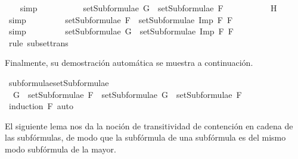 \begin{isabellebody}
\ {}\ \isamarkupfalse%
\ simp\ %
\isanewline
\ \ \ \ \ \ \isamarkupfalse%
\ \isamarkupfalse%
\ {}{}{\isacharcolon}{\isachardoublequoteopen}setSubformulae\ G\ {\isasymsubseteq}\ setSubformulae\ F{}{\isachardoublequoteclose}\ \isanewline
\ \ \ \ \ \ \ \ \isamarkupfalse%
\ H{}\ \isamarkupfalse%
\ simp\ %
\isanewline
\ \ \ \ \ \ \isamarkupfalse%
\ {}{}{\isacharcolon}{\isachardoublequoteopen}setSubformulae\ F{}\ {\isasymsubseteq}\ setSubformulae\ {\isacharparenleft}Imp\ F{}\ F{}{\isacharparenright}{\isachardoublequoteclose}\ \isanewline
\ \ \ \ \ \ \ \ \isamarkupfalse%
\ {}\ \isamarkupfalse%
\ simp\ %
\isanewline
\ \ \ \ \ \ \isamarkupfalse%
\ {\isachardoublequoteopen}setSubformulae\ G\ {\isasymsubseteq}\ setSubformulae\ {\isacharparenleft}Imp\ F{}\ F{}{\isacharparenright}{\isachardoublequoteclose}\ \isanewline
\ \ \ \ \ \ \ \ \isamarkupfalse%
\ {}{}\ {}{}\ \isamarkupfalse%
\ {\isacharparenleft}rule\ subset{\isacharunderscore}trans{\isacharparenright}\isanewline
\ \ \ \ \isamarkupfalse%
\isanewline
\ \ \isamarkupfalse%
\isanewline
{}\isamarkupfalse%
%
\endisatagproof
{\isafoldproof}%
%
\isadelimproof
%
\endisadelimproof
%
\begin{isamarkuptext}%
Finalmente, su demostración automática se muestra a continuación.%
\end{isamarkuptext}\isamarkuptrue%
\isamarkupfalse%
\ subformulae{\isacharunderscore}setSubformulae{\isacharcolon}\isanewline
\ \ {\isachardoublequoteopen}G\ {\isasymin}\ setSubformulae\ F\ {\isasymLongrightarrow}\ setSubformulae\ G\ {\isasymsubseteq}\ setSubformulae\ F{\isachardoublequoteclose}\isanewline
%
\isadelimproof
\ \ %
\endisadelimproof
%
\isatagproof
{}\isamarkupfalse%
\ {\isacharparenleft}induction\ F{\isacharparenright}\ auto%
\endisatagproof
{\isafoldproof}%
%
\isadelimproof
%
\endisadelimproof
%
\begin{isamarkuptext}%
El siguiente lema nos da la noción de transitividad de contención 
  en cadena de las subfórmulas, de modo que la subfórmula de una 
  subfórmula es del mismo modo subfórmula de la mayor. 
 

\end{isamarkuptext}
\end{isabellebody}
